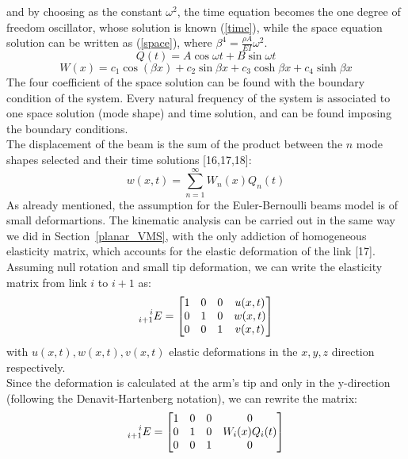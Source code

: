 \documentclass[a4paper,12pt,oneside]{report}
\begin{document}
and by choosing as the constant $\omega^2$, the time equation becomes the one degree of freedom oscillator, whose solution is known (\ref{time}), while the space equation solution can be written as (\ref{space}), where $\beta^4=\frac{\rho A}{EI}\omega^2$.
\begin{equation}
Q(t)=A\cos{\omega t}+B\sin{\omega t}
\label{time}
\end{equation}
\begin{equation}
W(x)=c_1\cos(\beta x)+c_2\sin{\beta x}+c_3\cosh{\beta x}+c_4\sinh{\beta x}
\label{space}
\end{equation}
The four coefficient of the space solution can be found with the boundary condition of the system. Every natural frequency of the system is associated to one space solution (mode shape) and time solution, and can be found imposing the boundary conditions.\\
The displacement of the beam is the sum of the product between the $n$ mode shapes selected and their time solutions [16,17,18]:
\begin{equation}
w(x,t)=\sum_{n=1}^\infty W_n(x)Q_n(t)
\label{overall}
\end{equation}
As already mentioned, the assumption for the Euler-Bernoulli beams model is of small deformartions. The kinematic analysis can be carried out in the same way we did in Section~\ref{planar_VMS}, with the only addiction of homogeneous elasticity matrix, which accounts for the elastic deformation of the link [17]. Assuming null rotation and small tip deformation, we can write the elasticity matrix from link $i$ to $i+1$ as:
\begin{equation}
  \prescript{i}{i+1}{E}=\begin{bmatrix}
    1&0&0&u(x,t)\\
    0&1&0&w(x,t)\\
    0&0&1&v(x,t)
  \end{bmatrix}
\end{equation}
with $u(x,t),w(x,t),v(x,t)$ elastic deformations in the $x,y,z$ direction respectively.\\
Since the deformation is calculated at the arm's tip and only in the y-direction (following the Denavit-Hartenberg notation), we can rewrite the matrix:
\begin{equation}
  \prescript{i}{i+1}{E}=\begin{bmatrix}
    1&0&0&0\\
    0&1&0&W_i(x)Q_i(t)\\
    0&0&1&0
  \end{bmatrix}
\end{equation}
\end{document}
